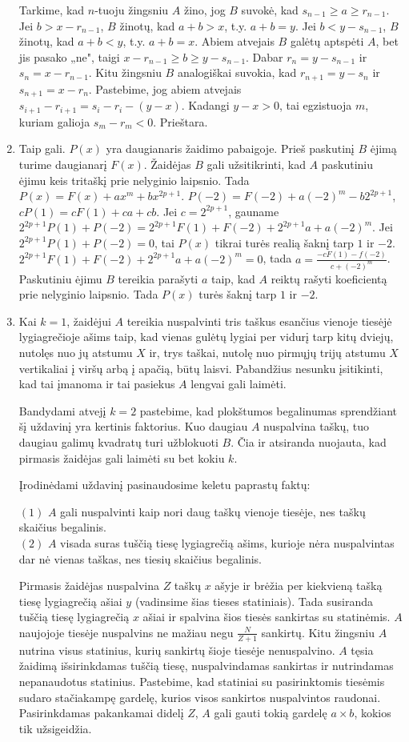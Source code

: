 \begin{enumerate}
Tarkime, kad $n$-tuoju žingsniu $A$ žino, jog $B$ suvokė, kad
$s_{n-1}\geq a\geq r_{n-1}$. Jei $b> x-r_{n-1}$, $B$ žinotų, kad $a+b>x$,
t.y. $a+b=y$.  Jei $b<y-s_{n-1}$, $B$ žinotų, kad $a+b<y$, t.y. $a+b=x$.
Abiem atvejais $B$	galėtų aptspėti $A$, bet jis pasako „ne", taigi
$x-r_{n-1}\geq b\geq y-s_{n-1}$. Dabar $r_{n}=y-s_{n-1}$ ir
$s_{n}=x-r_{n-1}$. Kitu žingsniu $B$ analogiškai suvokia, kad
$r_{n+1}=y-s_{n}$ ir $s_{n+1}=x-r_{n}$.  Pastebime, jog abiem atvejais
$s_{i+1}-r_{i+1}=s_{i}-r_{i}-(y-x)$. Kadangi $y-x>0$, tai egzistuoja $m$,
kuriam galioja $s_{m}-r_{m}<0$. Prieštara.
\item
Taip gali. $P(x)$ yra daugianaris žaidimo pabaigoje. Prieš paskutinį $B$
ėjimą turime daugianarį $F(x)$. Žaidėjas $B$ gali užsitikrinti, kad $A$
paskutiniu ėjimu keis tritaškį prie nelyginio laipsnio. Tada
$P(x)=F(x)+ax^m+bx^{2p+1}$. $P(-2)=F(-2)+a(-2)^m-b2^{2p+1}$,
$cP(1)=cF(1)+ca+cb$. Jei $c=2^{2p+1}$, gauname
$2^{2p+1}P(1)+P(-2)=2^{2p+1}F(1)+F(-2)+2^{2p+1}a+a(-2)^m$. Jei
$2^{2p+1}P(1)+P(-2)=0$, tai $P(x)$ tikrai turės realią šaknį tarp $1$ ir
$-2$.  $2^{2p+1}F(1)+F(-2)+2^{2p+1}a+a(-2)^m=0$, tada
$a=\frac{-cF(1)-f(-2)}{c+(-2)^m}$. Paskutiniu ėjimu $B$ tereikia parašyti
$a$ taip, kad $A$ reiktų rašyti koeficientą prie nelyginio laipsnio. Tada
$P(x)$ turės šaknį tarp $1$ ir $-2$.
\item
Kai $k=1$, žaidėjui $A$ tereikia nuspalvinti tris taškus esančius vienoje
tiesėjė lygiagrečioje ašims taip, kad vienas gulėtų lygiai per vidurį tarp
kitų dviejų, nutolęs nuo jų atstumu $X$ ir, trys taškai, nutolę nuo pirmųjų
trijų atstumu $X$ vertikaliai į viršų arbą į apačią, būtų laisvi. Pabandžius
nesunku įsitikinti, kad tai įmanoma ir tai pasiekus $A$ lengvai gali
laimėti. 

Bandydami atvejį $k=2$ pastebime, kad plokštumos begalinumas sprendžiant
šį uždavinį yra kertinis faktorius. Kuo daugiau $A$ nuspalvina taškų, tuo
daugiau galimų kvadratų turi užblokuoti $B$. Čia ir atsiranda nuojauta, kad
pirmasis žaidėjas gali laimėti su bet kokiu $k$.

Įrodinėdami uždavinį pasinaudosime keletu paprastų faktų:

$(1)$ $A$ gali nuspalvinti kaip nori daug taškų vienoje tiesėje, nes taškų
skaičius begalinis.\\
$(2)$ $A$ visada suras tuščią tiesę lygiagrečią ašims, kurioje nėra
nuspalvintas dar nė vienas taškas, nes tiesių skaičius begalinis.

Pirmasis žaidėjas nuspalvina $Z$ taškų $x$ ašyje ir brėžia per kiekvieną
tašką tiesę lygiagrečią ašiai $y$ (vadinsime šias tieses statiniais). Tada
susiranda tuščią tiesę lygiagrečią $x$ ašiai ir spalvina šios tiesės
sankirtas su statinėmis. $A$ naujojoje tiesėje nuspalvins ne mažiau negu $
\frac{N}{Z+1} $ sankirtų. Kitu žingsniu $A$ nutrina visus statinius,
kurių sankirtų šioje tiesėje nenuspalvino. $A$ tęsia žaidimą išsirinkdamas
tuščią tiesę, nuspalvindamas sankirtas ir nutrindamas nepanaudotus
statinius. Pastebime, kad statiniai su pasirinktomis tiesėmis sudaro
stačiakampę gardelę, kurios visos sankirtos nuspalvintos raudonai.
Pasirinkdamas pakankamai didelį $Z$, $A$ gali gauti tokią gardelę  $ a\times b
$, kokios tik užsigeidžia. 


\end{enumerate}
